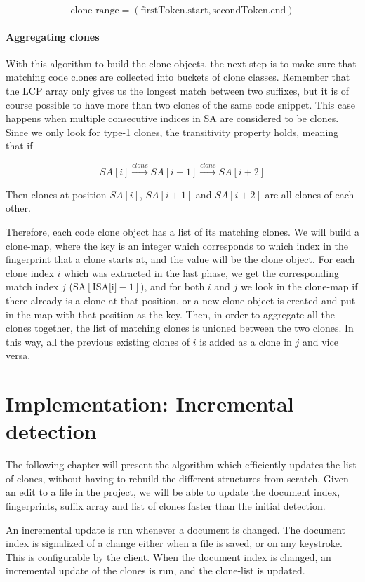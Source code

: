 $$
\text{clone range} = (\text{firstToken.start}, \text{secondToken.end})
$$

\subsubsection{Aggregating clones}

With this algorithm to build the clone objects, the next step is to make sure that
matching code clones are collected into buckets of clone classes. Remember that the LCP
array only gives us the longest match between two suffixes, but it is of course possible
to have more than two clones of the same code snippet. This case happens when multiple
consecutive indices in SA are considered to be clones. Since we only look for type-1
clones, the transitivity property holds, meaning that if

$$
SA[i] \xrightarrow{clone} SA[i+1] \xrightarrow{clone} SA[i + 2]
$$

Then clones at position $SA[i]$, $SA[i+1]$ and $SA[i + 2]$ are all clones of each other.

Therefore, each code clone object has a list of its matching clones. We will build a
clone-map, where the key is an integer which corresponds to which index in the fingerprint
that a clone starts at, and the value will be the clone object. For each clone index $i$
which was extracted in the last phase, we get the corresponding match index $j$
($\text{SA}[\text{ISA[i]} - 1]$), and for both $i$ and $j$ we look in the clone-map if
there already is a clone at that position, or a  new clone object is created and put in
the map with that position as the key. Then, in order to aggregate all the clones
together, the list of matching clones is unioned between the two clones. In this way, all
the previous existing clones of $i$ is added as a clone in $j$ and vice versa.


\chapter{Implementation: Incremental detection}

The following chapter will present the algorithm which efficiently updates the list of
clones, without having to rebuild the different structures from scratch. Given an edit
to a file in the project, we will be able to update the document index, fingerprints,
suffix array and list of clones faster than the initial detection.

An incremental update is run whenever a document is changed. The document index is
signalized of a change either when a file is saved, or on any keystroke. This is
configurable by the client. When the document index is changed, an incremental update of
the clones is run, and the clone-list is updated.

